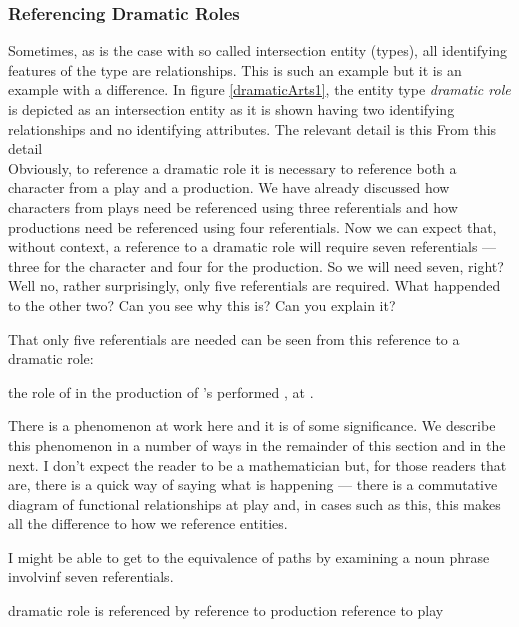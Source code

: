  \subsubsection{Referencing Dramatic Roles}
 \mynote
Sometimes, as is the case with so called intersection entity (types), 
all identifying features of the type are relationships. 
This is such an example but it is an example with a difference.
\mynote
In figure \ref{dramaticArts1}, the entity type \textit{dramatic role} is
depicted as an intersection entity as it is shown having
two identifying relationships and no identifying attributes.
The relevant detail is  this
From this detail 
\begin{equation*}

\end{equation*}
Obviously, to reference a dramatic role it is necessary to reference
both a character from a play and a production. 
We have already discussed how characters from plays need be referenced using three referentials
and  how productions need be referenced using four referentials.  
\mynote
Now we can expect that, without context, a reference to
a dramatic role will require seven referentials
 --- three for the character and four for the production. 
So we will need seven, right?
 Well no, rather surprisingly, only five referentials are required. 
 What happended to the other two? Can you see why this is? Can you explain it?

That only five referentials are needed can be seen from this reference to a dramatic role:
\begin{erquote}
\parbox{9.0cm}{the role of  in the production of \mbox{'s}  performed \mbox{,} at .
}
\end{erquote}

There is a phenomenon at work here and it is of some significance. 
We describe this phenomenon in a number of ways in the remainder of this section and in the next. 
I don't expect the reader to be a mathematician but, for those readers that are, there is a quick way of saying what is happening --- there is a commutative diagram of functional relationships at play and, in cases such as this, this makes all the difference to how we reference entities.

\begin{noteforfuture}
I might be able to get to the equivalence of paths by examining
a noun phrase involvinf seven referentials.

dramatic role is referenced by reference to production reference to play
\end{noteforfuture}

